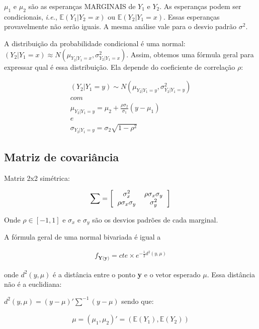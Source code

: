 \documentclass[11pt,a4paper]{article}
\begin{document}
		$\mu_1$ e $\mu_2$ são as esperanças MARGINAIS de $Y_1$ e $Y_2$.
		As esperanças podem ser condicionais, \textit{i.e.}, $\mathbb{E}(Y_1|Y_2=x)$ ou $\mathbb{E}(Y_2|Y_1=x)$.
		Essas esperanças provavelmente não serão iguais.
		A mesma análise vale para o desvio padrão $\sigma^2$.
		
		A distribuição da probabilidade condicional é uma normal: $(Y_2|Y_1=x)\approx N(\mu_{Y_2|Y_1=x},\sigma_{Y_2|Y_1=x}^2)$.
		Assim, obtemos uma fórmula geral para expressar qual é essa distribuição.
		Ela depende do coeficiente de correlação $\rho$:
		
		\begin{eqnarray*}
			(Y_2|Y_1=y)\sim N(\mu_{Y_2|Y_1=y},\sigma_{Y_2|Y_1=y}^2)\\
			com\\
			\mu_{Y_2|Y_1=y}=\mu_2+\frac{\rho\sigma_2}{\sigma_1}(y-\mu_1)\\
			e\\
			\sigma_{Y_2|Y_1=y}=\sigma_2\sqrt{1-\rho^2}
		\end{eqnarray*}
		
		\subsection{Matriz de covariância}
		
		Matriz 2x2 simétrica:
		
		\begin{eqnarray*}
			\sum = \left[
						\begin{tabular}{cc}
						$\sigma_x^2$ & $\rho\sigma_x\sigma_y$\\
						 $\rho\sigma_x\sigma_y$ & $\sigma_y^2$
						\end{tabular}
					\right]
		\end{eqnarray*}
		
		Onde $\rho\in [-1,1]$ e $\sigma_x$ e $\sigma_y$ são os desvios padrões de cada marginal.
		
		A fórmula geral de uma normal bivariada é igual a
		
		\begin{eqnarray*}
			f_\textbf{Y(y)}=cte\times e^{-\frac{1}{2}d^2(y,\mu)}
		\end{eqnarray*}
		
		onde $d^2(y,\mu)$ é a distância entre o ponto \textbf{y} e o vetor esperado $\mu$.
		Essa distância não é a euclidiana:
		
		$d^2(y,\mu)=(y-\mu)'\sum^{-1}(y-\mu)$
		sendo que:
		
		\begin{eqnarray*}
			\mu=(\mu_1,\mu_2)'=(\mathbb{E}(Y_1),\mathbb{E}(Y_2))
		\end{eqnarray*}
		
\end{document}
